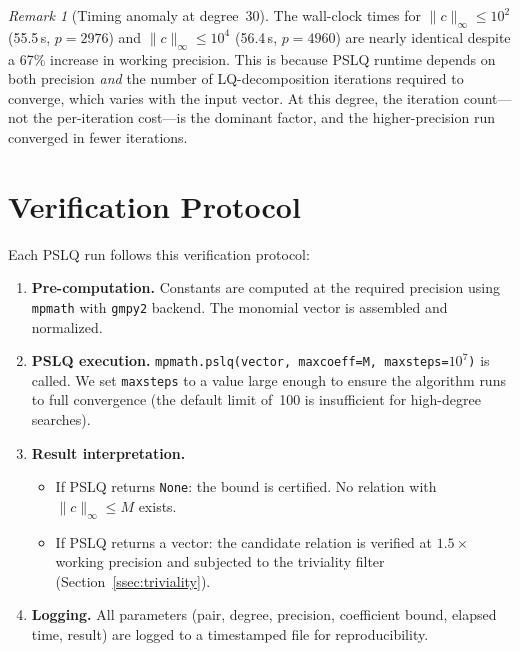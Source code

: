 \documentclass[11pt]{amsart}
\theoremstyle{remark}
\newtheorem{remark}[theorem]{Remark}
\newcommand{\norm}[1]{\lVert #1 \rVert}
\begin{document}
\begin{remark}[Timing anomaly at degree~30]
The wall-clock times for $\norm{c}_\infty\le 10^2$ (55.5\,s, $p=2976$) and
$\norm{c}_\infty\le 10^4$ (56.4\,s, $p=4960$) are nearly identical despite a 67\%
increase in working precision. This is because PSLQ runtime depends on both precision
\emph{and} the number of LQ-decomposition iterations required to converge, which
varies with the input vector. At this degree, the iteration count---not the
per-iteration cost---is the dominant factor, and the higher-precision run converged in
fewer iterations.
\end{remark}

\section{Verification Protocol}\label{app:protocol}

Each PSLQ run follows this verification protocol:

\begin{enumerate}
\item \textbf{Pre-computation.} Constants are computed at the required precision
  using \texttt{mpmath} with \texttt{gmpy2} backend. The monomial vector is assembled
  and normalized.

\item \textbf{PSLQ execution.}
  \texttt{mpmath.pslq(vector, maxcoeff=M, maxsteps=$10^7$)} is called. We set
  \texttt{maxsteps} to a value large enough to ensure the algorithm runs to full
  convergence (the default limit of~100 is insufficient for high-degree searches).

\item \textbf{Result interpretation.}
  \begin{itemize}
  \item If PSLQ returns \texttt{None}: the bound is certified. No relation with
    $\norm{c}_\infty\le M$ exists.
  \item If PSLQ returns a vector: the candidate relation is verified at $1.5\times$
    working precision and subjected to the triviality filter
    (Section~\ref{ssec:triviality}).
  \end{itemize}

\item \textbf{Logging.} All parameters (pair, degree, precision, coefficient bound,
  elapsed time, result) are logged to a timestamped file for reproducibility.
\end{enumerate}
\end{document}
